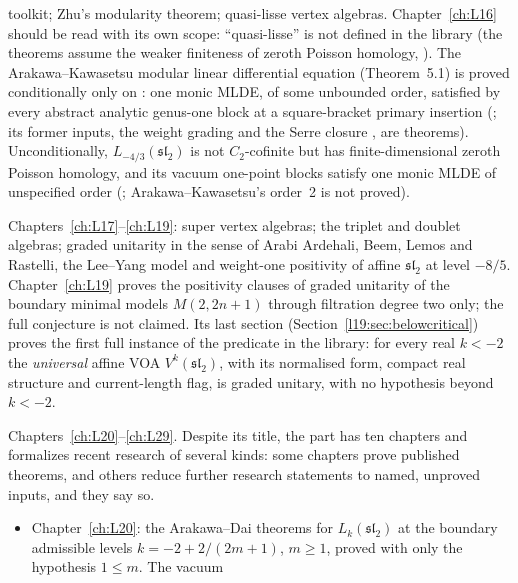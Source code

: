 \begin{description}
  toolkit; Zhu's modularity theorem; quasi-lisse vertex algebras. Chapter~\ref{ch:L16} should be read
  with its own scope: ``quasi-lisse'' is not defined in the library (the theorems assume the weaker
  finiteness of zeroth Poisson homology, ). The Arakawa--Kawasetsu modular linear
  differential equation (Theorem~5.1) is proved conditionally only on : one monic MLDE, of some
  unbounded order, satisfied by every abstract analytic genus-one block at a square-bracket primary insertion
  (; its former inputs, the weight
  grading  and the Serre closure , are theorems). Unconditionally,
  $L_{-4/3}(\mathfrak{sl}_2)$ is not $C_2$-cofinite but has finite-dimensional zeroth Poisson homology, and its vacuum
  one-point blocks satisfy one monic MLDE of unspecified order (;
  Arakawa--Kawasetsu's order~2 is not proved).
\item[Part V, Super, logarithmic and unitary theories.] Chapters~\ref{ch:L17}--\ref{ch:L19}: super
  vertex algebras; the triplet and doublet algebras; graded unitarity in the sense of Arabi Ardehali,
  Beem, Lemos and Rastelli, the Lee--Yang model
  and weight-one positivity of affine $\mathfrak{sl}_2$ at level $-8/5$.
  Chapter~\ref{ch:L19} proves the positivity clauses of graded unitarity of the boundary minimal models
  $M(2,2n+1)$ through filtration degree two only; the full conjecture is not claimed. Its last section
  (Section~\ref{l19:sec:belowcritical}) proves the first full instance of the predicate
   in the library: for every real $k<-2$ the \emph{universal} affine VOA
  $V^k(\mathfrak{sl}_2)$, with its normalised form, compact real structure and current-length flag, is
  graded unitary, with no hypothesis beyond $k<-2$.
\item[Part VI, Two recent theorems, formalized.] Chapters~\ref{ch:L20}--\ref{ch:L29}. Despite its
  title, the part has ten chapters and formalizes recent research of several kinds: some chapters
  prove published theorems, and others reduce further research statements to named, unproved inputs,
  and they say so.
  \begin{itemize}
  \item Chapter~\ref{ch:L20}: the Arakawa--Dai theorems for $L_k(\mathfrak{sl}_2)$ at the boundary
    admissible levels $k=-2+2/(2m+1)$, $m\ge1$, proved with only the hypothesis $1\le m$. The vacuum

\end{itemize}
\end{description}
